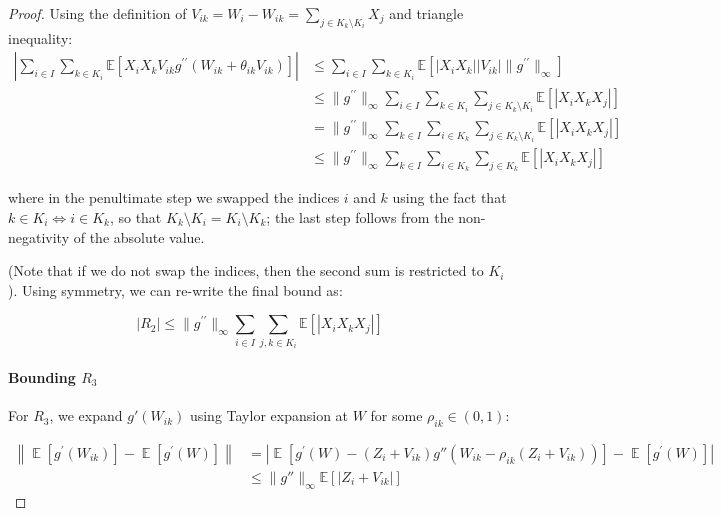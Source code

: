 \documentclass{article}
\begin{document}
\begin{proof}
Using the definition of $V_{ik} = W_i - W_{ik}=\sum_{j \in K_k\setminus K_i} X_j$ and triangle inequality:
\begin{align*}
    \left|\sum_{i\in I}\sum_{k\in K_{i}}{\mathbb{E}}[X_{i}X_{k} V_{ik} g^{\prime \prime}(W_{i k}+\theta_{i k} V_{i k})]\right| &\leq \sum_{i\in I}\sum_{k\in K_{i}}{\mathbb{E}}[|X_{i}X_{k}| |V_{ik}| \|g^{\prime \prime}\|_{\infty}]\\
    &\leq \|g^{\prime \prime}\|_{\infty} \sum_{i\in I}\sum_{k\in K_{i}}\sum_{j\in K_k\setminus K_i}{\mathbb{E}}[|X_{i}X_{k}X_{j}|]\\
    &= \|g^{\prime \prime}\|_{\infty} \sum_{k\in I}\sum_{i\in K_{k}}\sum_{j\in K_k\setminus K_i}{\mathbb{E}}[|X_{i}X_{k}X_{j}|]\\
    &\leq \|g^{\prime \prime}\|_{\infty} \sum_{k\in I}\sum_{i\in K_{k}}\sum_{j\in K_k}{\mathbb{E}}[|X_{i}X_{k}X_{j}|]
\end{align*}

where in the penultimate step we swapped the indices $i$ and $k$ using the fact that $k \in K_i \iff i \in K_k$, so that $K_k\setminus K_i = K_i\setminus K_k$; the last step follows from the non-negativity of the absolute value.  

(Note that if we do not swap the indices, then the second sum is restricted to $K_i$). Using symmetry, we can re-write the final bound as:  

\begin{equation}\label{eq:R2_bound}
    |R_2| \leq \|g^{\prime \prime}\|_{\infty} \sum_{i\in I}\sum_{j, k\in K_{i}}{\mathbb{E}}[|X_{i}X_{k}X_{j}|]
\end{equation}

\paragraph{Bounding $R_3$} For $R_3$, we expand $g'(W_{ik})$ using Taylor expansion at $W$ for some $\rho_{ik} \in (0,1)$:

\begin{align*}
    \left\|\operatorname{\mathbb{E}}[g^{\prime}(W_{i k})]-\operatorname{\mathbb{E}}[g^{\prime}(W)]\right\| &=\left|\operatorname{\mathbb{E}}[g^{\prime}(W) - (Z_i+V_{ik}) g''(W_{ik} - \rho_{ik} (Z_i+V_{ik}))] - \operatorname{\mathbb{E}}[g^{\prime}(W)]\right|\\
    &\leq \|g''\|_\infty \mathbb{E}[|Z_i+V_{ik}|]
\end{align*}


\end{proof}
\end{document}
